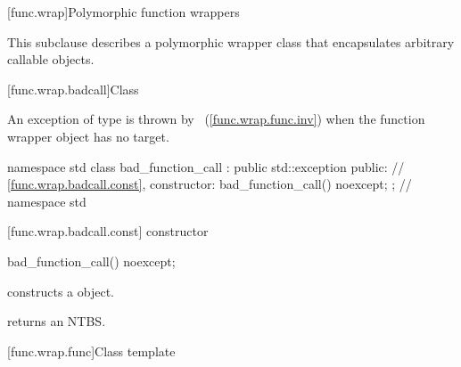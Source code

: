[func.wrap]{Polymorphic function wrappers}%

\pnum
This subclause describes a polymorphic wrapper class that
encapsulates arbitrary callable objects.

[func.wrap.badcall]{Class }%
%

\pnum
An exception of type  is thrown by
~(\ref{func.wrap.func.inv})
when the function wrapper object has no target.

\begin{codeblock}
namespace std {
  class bad_function_call : public std::exception {
  public:
    // \ref{func.wrap.badcall.const}, constructor:
    bad_function_call() noexcept;
  };
} // namespace std
\end{codeblock}

[func.wrap.badcall.const]{ constructor}

%
\begin{itemdecl}
bad_function_call() noexcept;
\end{itemdecl}

\begin{itemdescr}
\pnum\effects constructs a  object.
\end{itemdescr}

\begin{itemdescr}
\pnum\postconditions  {} returns an
 NTBS.
\end{itemdescr}

[func.wrap.func]{Class template }

